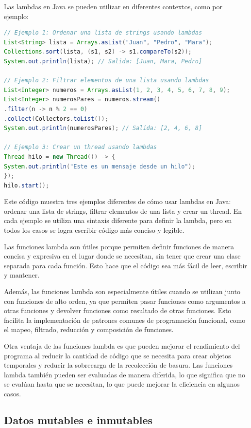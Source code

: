 \documentclass[executivepaper]{article}
\begin{document}
Las lambdas en Java se pueden utilizar en diferentes contextos, como por ejemplo:
\begin{lstlisting}[language=Java]
// Ejemplo 1: Ordenar una lista de strings usando lambdas
List<String> lista = Arrays.asList("Juan", "Pedro", "Mara");
Collections.sort(lista, (s1, s2) -> s1.compareTo(s2));
System.out.println(lista); // Salida: [Juan, Mara, Pedro]

// Ejemplo 2: Filtrar elementos de una lista usando lambdas
List<Integer> numeros = Arrays.asList(1, 2, 3, 4, 5, 6, 7, 8, 9);
List<Integer> numerosPares = numeros.stream()
.filter(n -> n % 2 == 0)
.collect(Collectors.toList());
System.out.println(numerosPares); // Salida: [2, 4, 6, 8]

// Ejemplo 3: Crear un thread usando lambdas
Thread hilo = new Thread(() -> {
System.out.println("Este es un mensaje desde un hilo");
});
hilo.start();
\end{lstlisting}
Este código muestra tres ejemplos diferentes de cómo usar lambdas en Java: ordenar una lista de strings, filtrar elementos de una lista y crear un thread. En cada ejemplo se utiliza una sintaxis diferente para definir la lambda, pero en todos los casos se logra escribir código más conciso y legible.

Las funciones lambda son útiles porque permiten definir funciones de manera concisa y expresiva en el lugar donde se necesitan, sin tener que crear una clase separada para cada función. Esto hace que el código sea más fácil de leer, escribir y mantener.

Además, las funciones lambda son especialmente útiles cuando se utilizan junto con funciones de alto orden, ya que permiten pasar funciones como argumentos a otras funciones y devolver funciones como resultado de otras funciones. Esto facilita la implementación de patrones comunes de programación funcional, como el mapeo, filtrado, reducción y composición de funciones.

Otra ventaja de las funciones lambda es que pueden mejorar el rendimiento del programa al reducir la cantidad de código que se necesita para crear objetos temporales y reducir la sobrecarga de la recolección de basura. Las funciones lambda también pueden ser evaluadas de manera diferida, lo que significa que no se evalúan hasta que se necesitan, lo que puede mejorar la eficiencia en algunos casos.

\subsection{Datos mutables e inmutables}
\end{document}
